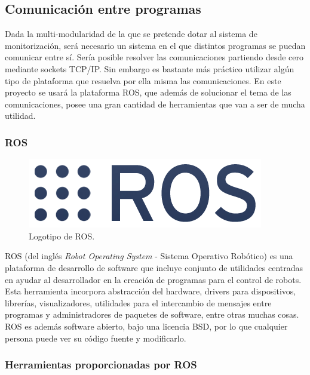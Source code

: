 \documentclass[12pt, a4paper]{report}
\begin{document}
\subsection{Comunicación entre programas}

Dada la multi-modularidad de la que se pretende dotar al sistema de monitorización, será necesario un sistema en el que distintos programas se puedan comunicar entre sí. Sería posible resolver las comunicaciones partiendo desde cero mediante sockets TCP/IP. Sin embargo es bastante más práctico utilizar algún tipo de plataforma que resuelva por ella misma las comunicaciones. En este proyecto se usará la plataforma ROS, que además de solucionar el tema de las comunicaciones, posee una gran cantidad de herramientas que van a ser de mucha utilidad. \\

\subsubsection{ROS}
\begin{figure}
  \begin{center}
    \includegraphics[scale=1.2]{../img/Logo-ROS.png} 
  \end{center}
  \caption[Logotipo de ROS]{Logotipo de ROS.}
  \label{fig: ros_logo}
\end{figure}
ROS (del inglés \textit{Robot Operating System} - Sistema Operativo Robótico) es una plataforma de desarrollo de software que incluye conjunto de utilidades centradas en ayudar al desarrollador en la creación de programas para el control de robots. Esta herramienta incorpora abstracción del hardware, drivers para dispositivos, librerías, visualizadores, utilidades para el intercambio de mensajes entre programas y administradores de paquetes de software, entre otras muchas cosas. ROS es además software abierto, bajo una licencia BSD, por lo que cualquier persona puede ver su código fuente y modificarlo.\\

\subsubsection{Herramientas proporcionadas por ROS}
\end{document}
